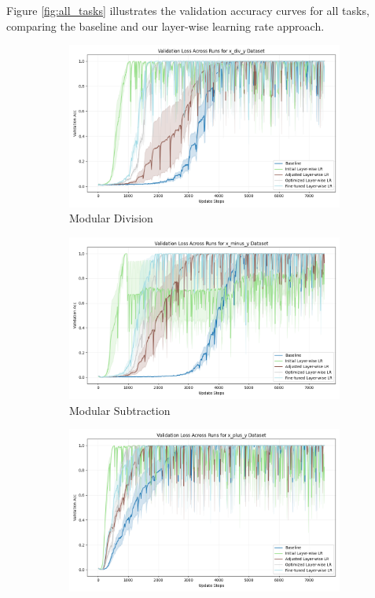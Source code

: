 \documentclass{article} %
\begin{document}
Figure \ref{fig:all_tasks} illustrates the validation accuracy curves for all tasks, comparing the baseline and our layer-wise learning rate approach.

\begin{figure}[h]
    \centering
    \begin{subfigure}{0.49\textwidth}
        \includegraphics[width=\textwidth]{val_acc_x_div_y.png}
        \caption{Modular Division}
        \label{fig:val_acc_div}
    \end{subfigure}
    \hfill
    \begin{subfigure}{0.49\textwidth}
        \includegraphics[width=\textwidth]{val_acc_x_minus_y.png}
        \caption{Modular Subtraction}
        \label{fig:val_acc_sub}
    \end{subfigure}
    \vspace{0.5cm}
    \begin{subfigure}{0.49\textwidth}
        \includegraphics[width=\textwidth]{val_acc_x_plus_y.png}

\end{subfigure}
\end{figure}
\end{document}
